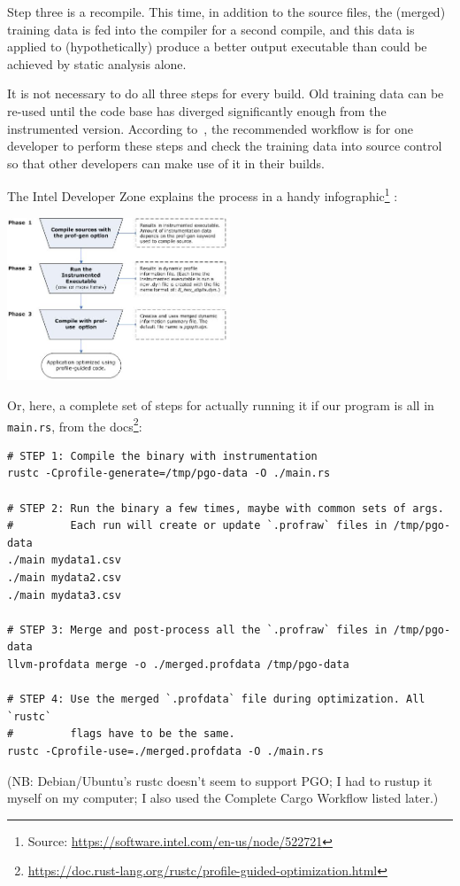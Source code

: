 \documentclass[a4paper]{report}
\begin{document}
Step three is a recompile. This time, in addition to the source files, the (merged) training data is fed into the compiler for a second compile, and this data is applied to (hypothetically) produce a better output executable than could be achieved by static analysis alone.


It is not necessary to do all three steps for every build. Old training data can be re-used until the code base has diverged significantly enough from the instrumented version. According to~\cite{pogo}, the recommended workflow is for one developer to perform these steps and check the training data into source control so that other developers can make use of it in their builds.

The Intel Developer Zone explains the process in a handy infographic\footnote{Source: \url{https://software.intel.com/en-us/node/522721}} :

\begin{center}
	\includegraphics[width=0.5\textwidth]{images/pogo-workflow.jpg}
\end{center}



Or, here, a complete set of steps for actually running it if our program is all in \texttt{main.rs}, from the docs\footnote{\url{https://doc.rust-lang.org/rustc/profile-guided-optimization.html}}:

{\scriptsize
\begin{verbatim}
# STEP 1: Compile the binary with instrumentation
rustc -Cprofile-generate=/tmp/pgo-data -O ./main.rs

# STEP 2: Run the binary a few times, maybe with common sets of args.
#         Each run will create or update `.profraw` files in /tmp/pgo-data
./main mydata1.csv
./main mydata2.csv
./main mydata3.csv

# STEP 3: Merge and post-process all the `.profraw` files in /tmp/pgo-data
llvm-profdata merge -o ./merged.profdata /tmp/pgo-data

# STEP 4: Use the merged `.profdata` file during optimization. All `rustc`
#         flags have to be the same.
rustc -Cprofile-use=./merged.profdata -O ./main.rs
\end{verbatim}
}
(NB: Debian/Ubuntu's rustc doesn't seem to support PGO; I had to rustup it myself on my computer; I also used the Complete Cargo Workflow listed later.)
\end{document}
